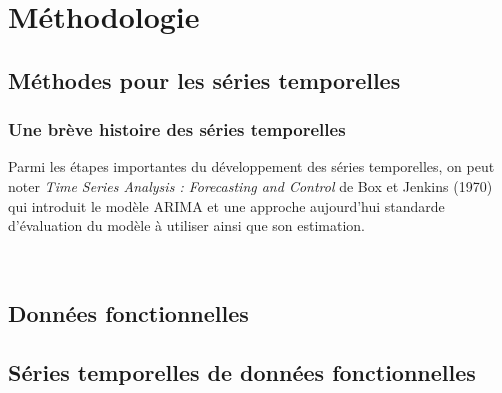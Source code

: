 \chapter{Méthodologie}
\minitoc%

\section{Méthodes pour les séries temporelles}

\subsection{Une brève histoire des séries temporelles}

Parmi les étapes importantes du développement des séries temporelles, on peut noter \emph{Time Series Analysis : Forecasting and Control} de Box et Jenkins (1970) qui introduit le modèle ARIMA et une approche aujourd'hui standarde d'évaluation du modèle à utiliser ainsi que son estimation.

~\cite[Time Series and Forecasting: Brief History and Future Research]{time_series_brief_history}

\section{Données fonctionnelles}
\section{Séries temporelles de données fonctionnelles}